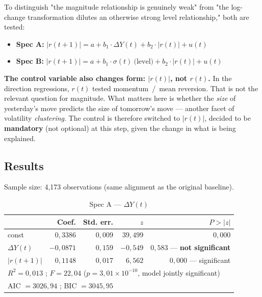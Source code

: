 \documentclass[12pt,a4paper]{article}
\begin{document}
To distinguish "the magnitude relationship is genuinely weak" from
"the log-change transformation dilutes an otherwise strong
level relationship," both are tested:

\vspace{0.3cm}


\begin{keyeq}
	
	\begin{itemize}
		\item \textbf{Spec A:} $|r(t+1)| = a + b_1 \cdot \Delta Y(t) + b_2 \cdot |r(t)| + u(t)$
		\item \textbf{Spec B:} $|r(t+1)| = a + b_1 \cdot \sigma(t)~\text{(level)} + b_2 \cdot |r(t)| + u(t)$
	\end{itemize}
\end{keyeq}
\vspace{0.3cm}

\textbf{The control variable also changes form: $|r(t)|$, not
	$r(t)$.} In the direction regressions, $r(t)$ tested
momentum~/~mean reversion. That is not the relevant question
for magnitude. What matters here is whether the \emph{size} of
yesterday's move predicts the size of tomorrow's move --- another
facet of volatility \emph{clustering}. The control is therefore
switched to $|r(t)|$, decided to be \textbf{mandatory} (not optional)
at this step, given the change in what is being explained.

\newpage

\subsection{Results}

Sample size: 4,173 observations (same alignment as the
original baseline).

\begin{table}[H]
	\centering
	\small
	\caption{Spec A --- $\Delta Y(t)$}
	\begin{tabular}{lrrrr}
		\toprule
		& Coef. & Std. err. & $z$ & $P>|z|$ \\
		\midrule
		const & $0{,}3386$ & $0{,}009$ & $39{,}499$ & $0{,}000$ \\
		$\Delta Y(t)$ & $-0{,}0871$ & $0{,}159$ & $-0{,}549$ & $0{,}583$ --- \textbf{not significant} \\
		$|r(t+1)|$ & $0{,}1148$ & $0{,}017$ & $6{,}562$ & $0{,}000$ --- significant \\
		\midrule
		\multicolumn{5}{l}{$R^2 = 0{,}013$ ; $F=22{,}04$ ($p=3{,}01\times10^{-10}$, model jointly significant)} \\
		\multicolumn{5}{l}{AIC $=3026{,}94$ ; BIC $=3045{,}95$} \\
		\bottomrule
	\end{tabular}
\end{table}
\end{document}
